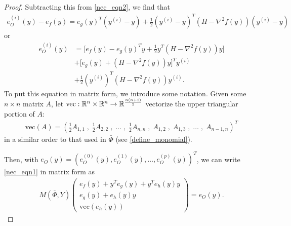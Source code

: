 \documentclass{article}
\newcommand{\matvec}{\mathrm{vec}}
\begin{document}
\begin{proof}
Subtracting this from \cref{nec_eqn2}, we find that
\begin{align*}
e^{(i)}_O\left(y\right) - e_f(y) = e_g(y)^T\left(y^{(i)} - y\right) +
\frac 1 2 \left(y^{(i)} - y\right)^T \left(H - \nabla^2 f(y)\right)\left(y^{(i)} - y\right)
\end{align*}
or
\begin{align}
e^{(i)}_O\left(y\right) &= \bigg[e_f(y) - e_g(y)^Ty + \frac 1 2 y^T \left(H - \nabla^2f(y)\right)y \bigg] \nonumber \\
&+ \bigg[e_g(y) + \left(H - \nabla^2 f(y)\right)y\bigg]^T y^{(i)} \nonumber \\
&+ \frac 1 2 \left(y^{(i)}\right)^T \left(H - \nabla^2 f(y)\right)y^{(i)}.
\label{nec_eqn1}
\end{align}
To put this equation in matrix form, we introduce some notation.
Given some $n \times n$ matrix $A$, let $\matvec : \reals^n \times \reals^n \to \reals^{\frac {n(n+1)} 2}$
vectorize the upper triangular portion of $A$:
\begin{align*}
\matvec\left(A\right) =
\left(\frac 1 2 A_{1, 1} \;,\; \frac 1 2 A_{2, 2} \;,\; \ldots \;,\; \frac 1 2 A_{n, n} \;,\; A_{1, 2} \;,\; A_{1, 3} \;,\; \ldots \;,\; A_{n-1, n} \right)^T
\end{align*}
in a similar order to that used in $\bar \Phi$ (see \cref{define_monomial}).

Then, with $e_O\left(y \right) = \left(
e^{(0)}_O\left(y\right),
e^{(1)}_O\left(y\right),
\ldots ,
e^{(p)}_O\left(y\right)
\right)^T$,
we can write \cref{nec_eqn1} in matrix form as 
\begin{align*}
M\left(\bar{\Phi}, Y\right)
\begin{pmatrix}
e_f(y) + y^Te_g(y) + y^Te_h(y) y \\
e_g(y) + e_h(y) y \\
\matvec\left(e_h(y)\right)
\end{pmatrix}
= e_O\left(y \right).
\end{align*}


\end{proof}
\end{document}
